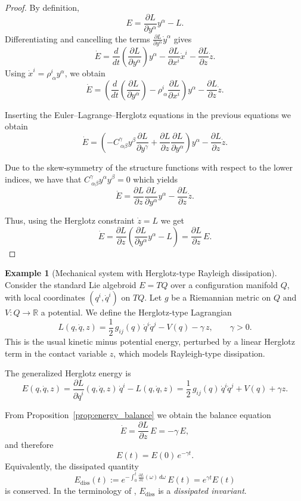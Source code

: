 \documentclass[11pt,a4paper]{article}
\theoremstyle{definition}
\newtheorem{example}[theorem]{Example}
\begin{document}
\begin{proof}
By definition,
\[
E=\frac{\partial L}{\partial y^\alpha}y^\alpha - L.
\]
Differentiating and cancelling the terms 
$\frac{\partial L}{\partial y^\alpha}\dot y^\alpha$ gives
\[
\dot E 
= 
\frac{d}{dt}\left(\frac{\partial L}{\partial y^\alpha}\right)y^\alpha
- \frac{\partial L}{\partial x^i}\dot x^i
- \frac{\partial L}{\partial z}\dot z.
\]
Using $\dot x^i=\rho^i_{\ \alpha}y^\alpha$, we obtain
\[
\dot E
=
\left(
\frac{d}{dt}\left(\frac{\partial L}{\partial y^\alpha}\right)
-
\rho^i_{\ \alpha}\frac{\partial L}{\partial x^i}
\right)y^\alpha
-
\frac{\partial L}{\partial z}\dot z.
\]

Inserting the Euler--Lagrange--Herglotz equations in the previous equations we obtain
\[
\dot E
=
\left(
- C^\gamma_{\ \alpha\beta}y^\beta\frac{\partial L}{\partial y^\gamma}
+ \frac{\partial L}{\partial z}\frac{\partial L}{\partial y^\alpha}
\right)y^\alpha
-
\frac{\partial L}{\partial z}\dot z.
\]

Due to the skew-symmetry of the structure functions with respect to the lower indices, we have that 
$C^\gamma_{\ \alpha\beta}y^\alpha y^\beta=0$ which yields
\[
\dot E
=
\frac{\partial L}{\partial z}\frac{\partial L}{\partial y^\alpha}y^\alpha
-
\frac{\partial L}{\partial z}\dot z.
\]

Thus, using the Herglotz constraint $\dot z=L$ we get
\[
\dot E
=
\frac{\partial L}{\partial z} \left(\frac{\partial L}{\partial y^\alpha}y^\alpha - L\right) = \frac{\partial L}{\partial z}\,E.
\]
\end{proof}
\begin{example}[Mechanical system with Herglotz-type Rayleigh dissipation]
Consider the standard Lie algebroid $E = TQ$ over a configuration manifold $Q$,
with local coordinates $(q^i,\dot q^i)$ on $TQ$.
Let $g$ be a Riemannian metric on $Q$ and $V \colon Q \to \mathbb{R}$ a potential.
We define the Herglotz-type Lagrangian
\[
L(q,\dot q,z)
= \frac{1}{2}\,g_{ij}(q)\,\dot q^i \dot q^j - V(q) - \gamma\,z,
\qquad \gamma > 0.
\]
This is the usual kinetic minus potential energy, perturbed by a linear 
Herglotz term in the contact variable $z$, which models Rayleigh-type 
dissipation.

The generalized Herglotz energy is
\[
E(q,\dot q,z)
= \frac{\partial L}{\partial \dot q^{i}}(q,\dot q,z)\,\dot q^{i} - L(q,\dot q,z)
= \frac{1}{2}\,g_{ij}(q)\,\dot q^i \dot q^j + V(q) + \gamma z.
\]

From Proposition~\ref{prop:energy_balance} we obtain the balance equation
\[
\dot E = \frac{\partial L}{\partial z}\,E = -\gamma\,E,
\]
and therefore
\[
E(t) = E(0)\,e^{-\gamma t}.
\]
Equivalently, the dissipated quantity
\[
E_{\mathrm{diss}}(t) 
:= e^{-\int_0^t \frac{\partial L}{\partial z}(\omega)\,d\omega}\, E(t)
= e^{\gamma t} E(t)
\]
is conserved.  
In the terminology of \cite{de2021symmetries}, 
$E_{\mathrm{diss}}$ is a \emph{dissipated invariant}.

\end{example}
\end{document}
